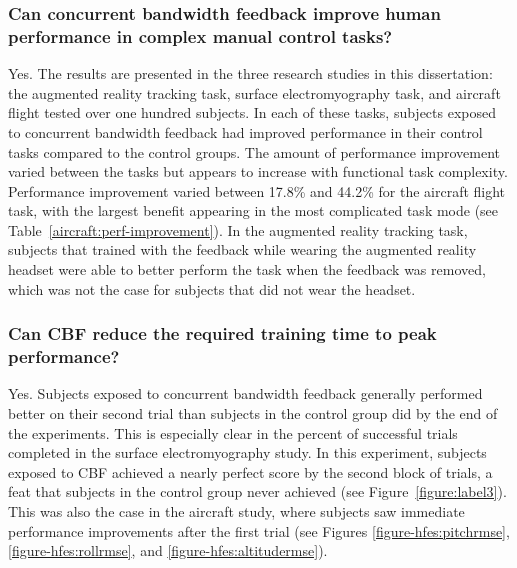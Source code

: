 \subsubsection{Can concurrent bandwidth feedback improve human performance in complex manual control tasks?}
Yes.
The results are presented in the three research studies in this dissertation: the augmented reality tracking task, surface electromyography task, and aircraft flight tested over one hundred subjects.
In each of these tasks, subjects exposed to concurrent bandwidth feedback had improved performance in their control tasks compared to the control groups.
The amount of performance improvement varied between the tasks but appears to increase with functional task complexity.
Performance improvement varied between 17.8\% and 44.2\% for the aircraft flight task, with the largest benefit appearing in the most complicated task mode (see Table~\ref{aircraft:perf-improvement}).
In the augmented reality tracking task, subjects that trained with the feedback while wearing the augmented reality headset were able to better perform the task when the feedback was removed, which was not the case for subjects that did not wear the headset.

\subsubsection{Can CBF reduce the required training time to peak performance?}
Yes.
Subjects exposed to concurrent bandwidth feedback generally performed better on their second trial than subjects in the control group did by the end of the experiments.
This is especially clear in the percent of successful trials completed in the surface electromyography study.
In this experiment, subjects exposed to CBF achieved a nearly perfect score by the second block of trials, a feat that subjects in the control group never achieved (see Figure~\ref{figure:label3}).
This was also the case in the aircraft study, where subjects saw immediate performance improvements after the first trial (see Figures \ref{figure-hfes:pitchrmse}, \ref{figure-hfes:rollrmse}, and \ref{figure-hfes:altitudermse}).

